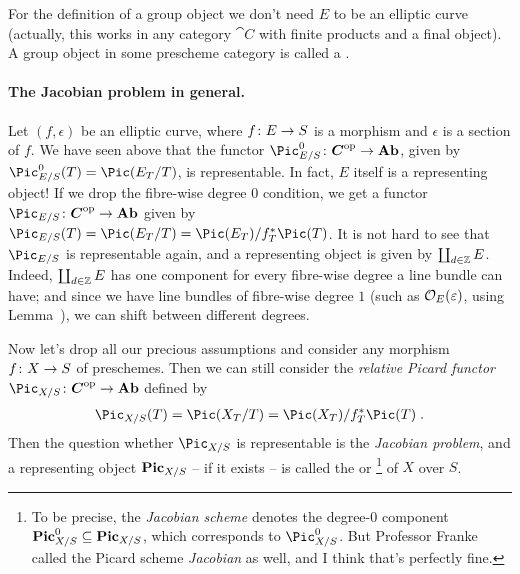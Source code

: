 \documentclass[a4paper,parskip=half,numbers=enddot, DIV=12]{scrreprt}
\begin{document}
	For the definition of a group object we don't need $E$ to be an elliptic curve (actually, this works in any category $\cat C$ with finite products and a final object). A group object in some prescheme category is called a .
	
\paragraph{The Jacobian problem in general.}
Let $(f,\epsilon)$ be an elliptic curve, where $f\colon E\morphism S$ is a morphism and $\epsilon$ is a section of $f$. We have seen above that the functor $\Pic_{E/S}^0\colon \cat{C}^\op\morphism\cat{Ab}$, given by $\Pic_{E/S}^0(T)=\Pic(E_T/T)$, is representable. In fact, $E$ itself is a representing object! If we drop the fibre-wise degree $0$ condition, we get a functor $\Pic_{E/S}\colon \cat{C}^\op\morphism\cat{Ab}$ given by $\Pic_{E/S}(T)=\Pic(E_T/T)=\Pic(E_T)/f_T^*\Pic(T)$. It is not hard to see that $\Pic_{E/S}$ is representable again, and a representing object is given by $\coprod_{d\in\mathbb{Z}}E$. Indeed, $\coprod_{d\in\mathbb{Z}}E$ has one component for every fibre-wise degree a line bundle can have; and since we have line bundles of fibre-wise degree $1$ (such as $\mathcal{O}_E(\varepsilon)$, using Lemma~), we can shift between different degrees.

Now let's drop all our precious assumptions and consider any morphism $f\colon X\morphism S$ of preschemes. Then we can still consider the \emph{relative Picard functor} $\Pic_{X/S}\colon \cat{C}^\op \morphism\cat{Ab}$ defined by
\begin{align}\lbl{eq:PicCS}
	\Pic_{X/S}(T)=\Pic(X_T/T)=\Pic(X_T)/f_T^*\Pic(T)\;.
\end{align}
Then the question whether $\Pic_{X/S}$ is representable is the \emph{Jacobian problem}, and a representing object $\mathbf{Pic}_{X/S}$ -- if it exists -- is called the  or \footnote{To be precise, the \emph{Jacobian scheme} denotes the degree-$0$ component $\mathbf{Pic}_{X/S}^0\subseteq \mathbf{Pic}_{X/S}$, which corresponds to $\Pic_{X/S}^0$. But Professor Franke called the Picard scheme \emph{Jacobian} as well, and I think that's perfectly fine.} of $X$ over $S$.
\end{document}
